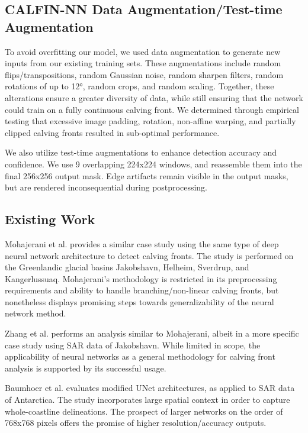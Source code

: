 \documentclass[tc, manuscript]{copernicus}
\begin{document}
\subsection{CALFIN-NN Data Augmentation/Test-time Augmentation}
\label{sec:augmentation}
To avoid overfitting our model, we used data augmentation to generate new inputs from our existing training sets. These augmentations include random flips/transpositions, random Gaussian noise, random sharpen filters, random rotations of up to 12°, random crops, and random scaling. Together, these alterations ensure a greater diversity of data, while still ensuring that the network could train on a fully continuous calving front. We determined through empirical testing that excessive image padding, rotation, non-affine warping, and partially clipped calving fronts resulted in sub-optimal performance.

We also utilize test-time augmentations to enhance detection accuracy and confidence. We use 9 overlapping 224x224 windows, and reassemble them into the final 256x256 output mask. Edge artifacts remain visible in the output masks, but are rendered inconsequential during postprocessing.

\subsection{Existing Work}
\label{sec:existing}
Mohajerani et al. provides a similar case study using the same type of deep neural network architecture to detect calving fronts. The study is performed on the Greenlandic glacial basins Jakobshavn, Helheim, Sverdrup, and Kangerlussuaq. Mohajerani's methodology is restricted in its preprocessing requirements and ability to handle branching/non-linear calving fronts, but nonetheless displays promising steps towards generalizability of the neural network method.

Zhang et al. performs an analysis similar to Mohajerani, albeit in a more specific case study using SAR data of Jakobshavn. While limited in scope, the applicability of neural networks as a general methodology for calving front analysis is supported by its successful usage.

Baumhoer et al. evaluates modified UNet architectures, as applied to SAR data of Antarctica. The study incorporates large spatial context in order to capture whole-coastline delineations. The prospect of larger networks on the order of 768x768 pixels offers the promise of higher resolution/accuracy outputs.
\end{document}

